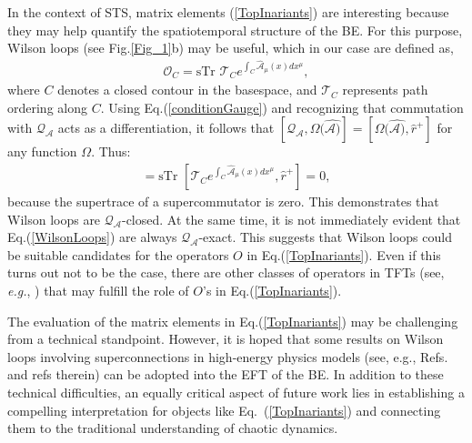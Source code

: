 \documentclass[final,5p,10pt,times,twocolumn,year]{elsarticle}
\begin{document}
In the context of STS, matrix elements (\ref{TopInariants}) are interesting because they may help quantify the spatiotemporal structure of the BE. For this purpose, Wilson loops (see Fig.\ref{Fig_1}b) may be useful, which in our case are defined as,
\begin{eqnarray}
    \mathcal{O}_{C} = \text{sTr } {\mathcal T}_C e^{\int_C \hat {\mathcal A}_\mu(x) dx^\mu},\label{WilsonLoops}
\end{eqnarray}
where $C$ denotes a closed contour in the basespace, and ${\mathcal T}_C$ represents path ordering along $C$. Using Eq.(\ref{conditionGauge}) and recognizing that commutation with $\mathcal Q_{\mathcal A}$ acts as a differentiation, it follows that $[\mathcal{Q}_{\mathcal A},\Omega(\hat{\mathcal A)}] = [\Omega(\hat{\mathcal A)},\hat r^+]$ for any function $\Omega$. Thus:
\begin{eqnarray}
    [\mathcal{Q}_{\mathcal A},\mathcal{O}_{C}] = \text{sTr } [{\mathcal T}_{C} e^{\int_C \hat {\mathcal A}_\mu(x) dx^\mu}, \hat r^+] = 0,
\end{eqnarray}
because the supertrace of a supercommutator is zero. This demonstrates that Wilson loops are $\mathcal Q_\mathcal{A}$-closed. At the same time, it is not immediately evident that Eq.(\ref{WilsonLoops}) are always $\mathcal Q_\mathcal{A}$-exact. This suggests that Wilson loops could be suitable candidates for the operators $O$ in Eq.(\ref{TopInariants}). Even if this turns out not to be the case, there are other classes of operators in TFTs (see, \emph{e.g.}, \cite{TFT_BOOK}) that may fulfill the role of $O$'s in Eq.(\ref{TopInariants}). 

The evaluation of the matrix elements in Eq.(\ref{TopInariants}) may be challenging from a technical standpoint. However, it is hoped that some results on Wilson loops involving superconnections in high-energy physics models (see, e.g., Refs.\cite{WilsonLoopsMaldacena,WilsonLoops1} and refs therein) can be adopted into the EFT of the BE. In addition to these technical difficulties, an equally critical aspect of future work lies in establishing a compelling interpretation for objects like Eq.~(\ref{TopInariants}) and connecting them to the traditional understanding of chaotic dynamics.

\end{document}
